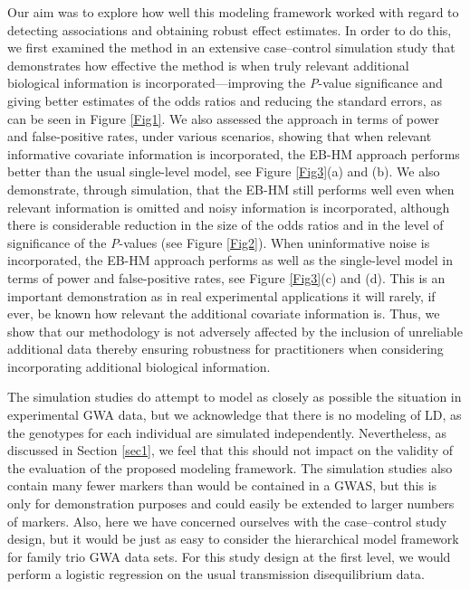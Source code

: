 \documentclass[oupdraft]{bio}
\begin{document}
Our aim was to explore how well this modeling framework worked
with regard to detecting associations and obtaining robust
effect estimates. In order to do this, we first examined the
method in an extensive case--control simulation study that
demonstrates how effective the method is when truly relevant
additional biological information is incorporated---improving
the \textit{P}-value significance and giving better estimates
of the odds ratios and reducing the standard errors, as can
be seen in Figure \ref{Fig1}. We also assessed the approach
in terms of power and false-positive rates, under various
scenarios, showing that when relevant informative covariate
information is incorporated, the EB-HM approach performs
better than the usual single-level model, see
Figure \ref{Fig3}(a) and (b). We also demonstrate, through
simulation, that the EB-HM still performs well even when
relevant information is omitted and noisy information is
incorporated, although there is considerable reduction in
the size of the odds ratios and in the level of significance
of the \textit{P}-values (see Figure \ref{Fig2}). When
uninformative noise is incorporated, the EB-HM approach
performs as well as the single-level model in terms of power
and false-positive rates, see Figure \ref{Fig3}(c) and (d).
This is an important demonstration as in real experimental
applications it will rarely, if ever, be known how relevant
the additional covariate information is. Thus, we show that
our methodology is not adversely affected by the inclusion of
unreliable additional data thereby ensuring robustness for
practitioners when considering incorporating additional
biological information.

The simulation studies do attempt to model as closely as
possible the situation in experimental GWA data, but we
acknowledge that there is no modeling of LD, as the genotypes
for each individual are simulated independently. Nevertheless,
as discussed in Section \ref{sec1}, we feel that this should
not impact on the validity of the evaluation of the proposed
modeling framework. The simulation studies also contain many
fewer markers than would be contained in a GWAS, but this
is only for demonstration purposes and could easily be
extended to larger numbers of markers. Also, here we have
concerned ourselves with the case--control study design,
but it would be just as easy to consider the hierarchical
model framework for family trio GWA data sets. For this
study design at the first level, we would perform a
logistic regression on the usual transmission
disequilibrium data.
\end{document}
